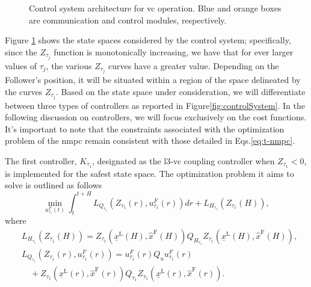 %
\begin{figure}[H]
	\resizebox{\linewidth}{!}{}
	\caption{Control system architecture for \gls{vc} operation. Blue and orange boxes are communication and control modules, respectively. }
	\label{fig:Z_tau_graph}
\end{figure}

Figure \ref{fig:Z_tau_graph} shows the state spaces considered by the control system; specifically, since the $Z_{\tau_j}$ function is monotonically increasing, we have that for ever larger values of $\tau_j$, the various $Z_{\tau_j}$ curves have a greater value.  Depending on the Follower's position, it will be situated within a region of the space delineated by the curves $Z_{\tau_j}$. Based on the state space under consideration, we will differentiate between three types of controllers as reported in Figure\tildeAdd\ref{fig:controlSystem}. In the following discussion on controllers, we will focus exclusively on the cost functions. It's important to note that the constraints associated with the optimization problem of the \gls{nmpc} remain consistent with those detailed in Eqs.\eqref{eq:t-nmpc}.

The first controller, $K_{\tau_{1}}$, designated as the \gls{l3}-\gls{vc} coupling controller when $Z_{\tau_1} < 0$, is implemented for the safest state space. The optimization problem it aims to solve is outlined as follows
%
\begin{equation}
	\min_{u_{\tau_{1}}^F(t)} \int_{t}^{t+H} L_{Q_{\tau_1}}(Z_{\tau_1}(r),u_{\tau_{1}}^F(r)) dr + L_{H_{\tau_{1}}}(Z_{\tau_1}(H)),
\end{equation}
%
where
\begin{align*}
	&L_{H_{\tau_{1}}}(Z_{\tau_1}(H)) =  Z_{\tau_1}\left(\underline{x}^\mathrm{L}(H),\hat{x}^\mathrm{F}(H)\right) Q_{H_{\tau_1}} Z_{\tau_1}\left(\underline{x}^\mathrm{L}(H),\hat{x}^\mathrm{F}(H)\right), \\
	&L_{Q_{\tau_1}}(Z_{\tau_1}(r),u_{\tau_{1}}^F(r)) =  u_{\tau_{1}}^F(r)  Q_u u_{\tau_{1}}^F(r) \\
	&\quad +  Z_{\tau_1}\left(\underline{x}^\mathrm{L}(r),\hat{x}^\mathrm{F}(r)\right) Q_{\tau_1} Z_{\tau_1}\left(\underline{x}^\mathrm{L}(r),\hat{x}^\mathrm{F}(r)\right).
\end{align*}

